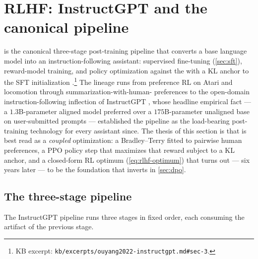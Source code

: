 
\section{RLHF: InstructGPT and the canonical pipeline}
\label{sec:rlhf}

 is the canonical
three-stage post-training pipeline that converts a base language
model into an instruction-following assistant: supervised fine-tuning
(\cref{sec:sft}), reward-model training, and policy optimization
against the  with a KL anchor to the SFT initialization
\citep[\S 3]{ouyang2022-instructgpt}.\footnote{KB excerpt:
\texttt{kb/excerpts/ouyang2022-instructgpt.md\#sec-3}.} The lineage
runs from preference RL on Atari and locomotion
\citep{christiano2017-pref-rl} through summarization-with-human-
preferences \citep{stiennon2020-summarize} to the open-domain
instruction-following inflection of InstructGPT
\citep{ouyang2022-instructgpt}, whose headline empirical fact — a
$1.3$B-parameter aligned model preferred over a $175$B-parameter
unaligned base on user-submitted prompts
\citep[\S 4]{ouyang2022-instructgpt} — established the pipeline as
the load-bearing post-training technology for every assistant 
since. The thesis of this section is that  is best read as a
\emph{coupled} optimization: a Bradley--Terry  fitted to
pairwise human preferences, a PPO policy step that maximizes that
reward subject to a KL anchor, and a closed-form RL optimum
(\cref{eq:rlhf-optimum}) that turns out — six years later — to be the
foundation that  inverts in \cref{sec:dpo}.

\subsection{The three-stage pipeline}
\label{sec:rlhf-pipeline}

The InstructGPT pipeline \citep[\S 3]{ouyang2022-instructgpt} runs
three stages in fixed order, each consuming the artifact of the
previous stage.


